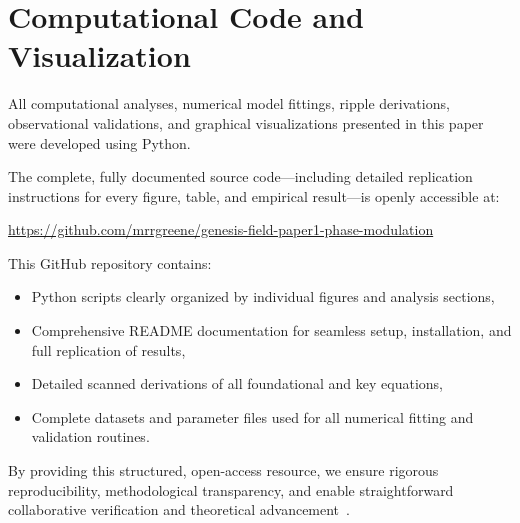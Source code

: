 \section{Computational Code and Visualization}
\label{sec:appendix_code}

All computational analyses, numerical model fittings, ripple derivations, observational validations, and graphical visualizations presented in this paper were developed using Python.

The complete, fully documented source code—including detailed replication instructions for every figure, table, and empirical result—is openly accessible at:

\begin{center}
\url{https://github.com/mrrgreene/genesis-field-paper1-phase-modulation}
\end{center}

This GitHub repository contains:

\begin{itemize}
    \item Python scripts clearly organized by individual figures and analysis sections,
    \item Comprehensive README documentation for seamless setup, installation, and full replication of results,
    \item Detailed scanned derivations of all foundational and key equations,
    \item Complete datasets and parameter files used for all numerical fitting and validation routines.
\end{itemize}

By providing this structured, open-access resource, we ensure rigorous reproducibility, methodological transparency, and enable straightforward collaborative verification and theoretical advancement~\cite{genesisfield2025code}.
